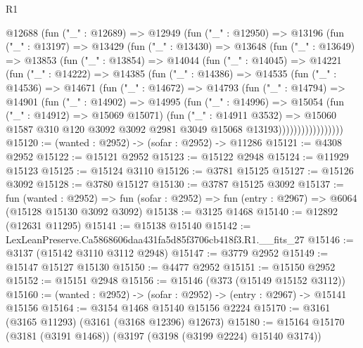\begin{lexlean}{R1}
\begin{coremodule}
      @12688
        (fun ("_" : @12689) =>
        @12949
          (fun ("_" : @12950) =>
          @13196
            (fun ("_" : @13197) =>
            @13429
              (fun ("_" : @13430) =>
              @13648
                (fun ("_" : @13649) =>
                @13853
                  (fun ("_" : @13854) =>
                  @14044
                    (fun ("_" : @14045) =>
                    @14221
                      (fun ("_" : @14222) =>
                      @14385
                        (fun ("_" : @14386) =>
                        @14535
                          (fun ("_" : @14536) =>
                          @14671
                            (fun ("_" : @14672) =>
                            @14793
                              (fun ("_" : @14794) =>
                              @14901
                                (fun ("_" : @14902) =>
                                @14995
                                  (fun ("_" : @14996) =>
                                  @15054
                                    (fun ("_" : @14912) => @15069 @15071)
                                    (fun ("_" : @14911 @3532) =>
                                    @15060
                                      @1587
                                      @310
                                      @120
                                      @3092
                                      @3092
                                      @2981
                                      @3049
                                      @15068
                                      @13193)))))))))))))))))
@15120 := (wanted : @2952) -> (sofar : @2952) -> @11286
@15121 := @4308 @2952
@15122 := @15121 @2952
@15123 := @15122 @2948
@15124 := @11929 @15123
@15125 := @15124 @3110
@15126 := @3781 @15125
@15127 := @15126 @3092
@15128 := @3780 @15127
@15130 := @3787 @15125 @3092
@15137 := fun (wanted : @2952) =>
  fun (sofar : @2952) => fun (entry : @2967) => @6064 (@15128 @15130 @3092 @3092)
@15138 := @3125 @1468
@15140 := @12892 (@12631 @11295)
@15141 := @15138 @15140
@15142 := LexLeanPreserve.Ca5868606daa431fa5d85f3706cb418f3.R1.__fits_27
@15146 := @3137 (@15142 @3110 @3112 @2948)
@15147 := @3779 @2952
@15149 := @15147 @15127 @15130
@15150 := @4477 @2952
@15151 := @15150 @2952
@15152 := @15151 @2948
@15156 := @15146 (@373 (@15149 @15152 @3112))
@15160 := (wanted : @2952) -> (sofar : @2952) -> (entry : @2967) -> @15141 @15156
@15164 := @3154 @1468 @15140 @15156 @2224
@15170 := @3161 (@3165 @11293) (@3161 (@3168 @12396) @12673)
@15180 := @15164 @15170 (@3181 (@3191 @1468)) (@3197 (@3198 (@3199 @2224) @15140 @3174))

\end{coremodule}
\end{lexlean}
